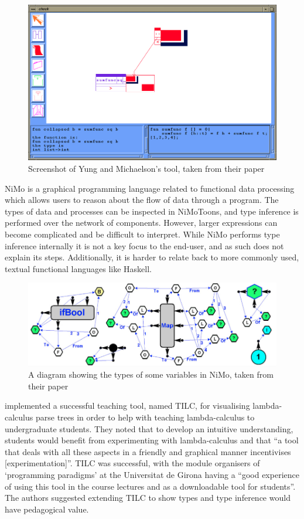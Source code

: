 \documentclass[a4paper,fleqn,twoside,12pt]{report}
\begin{document}
{\centering \begin{figure}[h!]
  \centering
  \includegraphics[width=0.797\linewidth]{images/image6.png}
  \caption{Screenshot of Yung and Michaelson's tool, taken from their paper}
\end{figure} \par}

NiMo \citep{ref8} is a graphical programming language related to functional data processing which allows users to reason about the flow of data through a program. The types of data and processes can be inspected in NiMoToons, and type inference is performed over the network of components. However, larger expressions can become complicated and be difficult to interpret. While NiMo performs type inference internally it is not a key focus to the end-user, and as such does not explain its steps. Additionally, it is harder to relate back to more commonly used, textual functional languages like Haskell.

{\centering \begin{figure}[h!]
  \centering
  \includegraphics[width=0.960\linewidth]{images/image25.png}
  \caption{A diagram showing the types of some variables in NiMo, taken from their paper}
\end{figure} \par}

\cite{ref9} implemented a successful teaching tool, named TILC, for visualising lambda-calculus parse trees in order to help with teaching lambda-calculus to undergraduate students. They noted that to develop an intuitive understanding, students would benefit from experimenting with lambda-calculus and that “a tool that deals with all these aspects in a friendly and graphical manner incentivises [experimentation]”. TILC was successful, with the module organisers of ‘programming paradigms’ at the Universitat de Girona having a “good experience of using this tool in the course lectures and as a downloadable tool for students”. The authors suggested extending TILC to show types and type inference would have pedagogical value.
\end{document}
